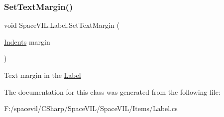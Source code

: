 \subsubsection{\texorpdfstring{Set\+Text\+Margin()}{SetTextMargin()}}
{\footnotesize\ttfamily void Space\+V\+I\+L.\+Label.\+Set\+Text\+Margin (\begin{DoxyParamCaption}\item[{\mbox{\hyperlink{struct_space_v_i_l_1_1_decorations_1_1_indents}{Indents}}}]{margin }\end{DoxyParamCaption})\hspace{0.3cm}{\ttfamily [inline]}}



Text margin in the \mbox{\hyperlink{class_space_v_i_l_1_1_label}{Label}} 



The documentation for this class was generated from the following file\+:\begin{DoxyCompactItemize}
\item 
F\+:/spacevil/\+C\+Sharp/\+Space\+V\+I\+L/\+Space\+V\+I\+L/\+Items/Label.\+cs\end{DoxyCompactItemize}
